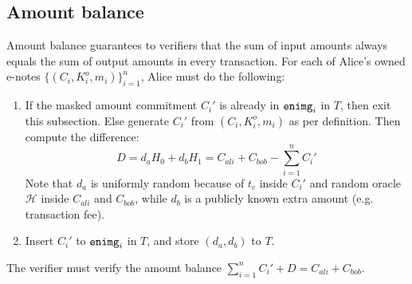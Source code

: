 \documentclass{article}
\theoremstyle{plain}
\theoremstyle{remark}
\begin{document}
\subsection{Amount balance}\label{amt-bal}
Amount balance guarantees to verifiers that the sum of input amounts always equals the sum of output amounts in
every transaction. For each of Alice's owned e-notes $\{(C_i,K_i^o,m_i)\}_{i=1}^n$, Alice must do the following:
\begin{enumerate}
    \item If the masked amount commitment $C_i'$ is already in ${\tt enimg}_i$ in $T$, then exit this subsection. Else generate $C_i'$ from $(C_i, K_i^o, m_i)$ as per definition. Then compute the difference:
    $$D = d_a H_0 + d_b H_1 = C_{ali}+C_{bob} - \sum_{i=1}^n{C_i'}$$
    Note that $d_a$ is uniformly random because of $t_c$ inside $C_i'$ and random oracle $\mathcal{H}$ inside $C_{ali}$ and $C_{bob}$, while $d_b$ is a publicly known extra amount (e.g. transaction fee).
    \item Insert $C_i'$ to ${\tt enimg}_i$ in $T$, and store $(d_a, d_b)$ to $T$.
\end{enumerate}
The verifier must verify the amount balance $\sum_{i=1}^n{C_i'} + D = C_{ali}+C_{bob}$.
\end{document}
